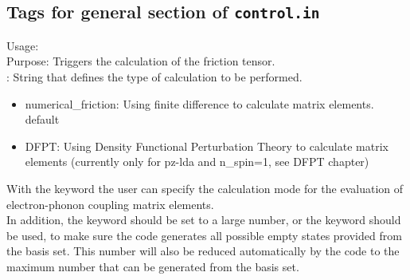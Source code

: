 \subsection*{Tags for general section of \texttt{control.in}}

 {
\noindent
Usage:  \\
Purpose: Triggers the calculation of the friction tensor.\\
: String that defines the type of calculation to be performed.
\begin{itemize}
\item numerical\_friction: Using finite difference to calculate matrix elements. default
\item DFPT: Using Density Functional Perturbation Theory to calculate matrix elements (currently only for pz-lda and n\_spin=1, see DFPT chapter)
\end{itemize}
}

With the keyword  the user can specify the calculation mode for the evaluation of electron-phonon coupling matrix elements.\\
In addition, the keyword  should be set to a large number, or the keyword  should be used, to make sure the code generates all possible empty states provided from the basis set. This number will also be reduced automatically by the code to the maximum number that can be generated from the basis set.


% 

